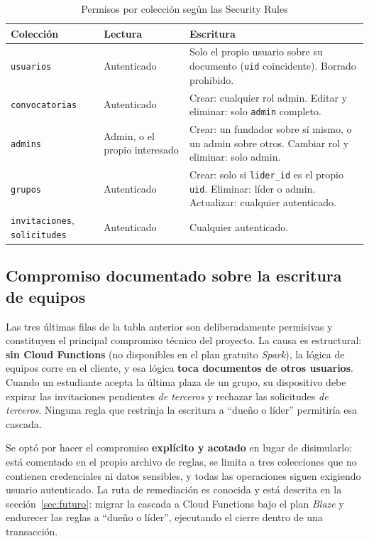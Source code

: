 \documentclass[12pt,a4paper]{article}
\begin{document}
\begin{table}[htbp]
\centering
\caption{Permisos por colección según las Security Rules}
\begin{tabular}{L{2.6cm}L{2.6cm}L{8.3cm}}
\toprule
\textbf{Colección} & \textbf{Lectura} & \textbf{Escritura} \\
\midrule
\texttt{usuarios} & Autenticado & Solo el propio usuario sobre su documento (\texttt{uid} coincidente). Borrado prohibido. \\
\texttt{convocatorias} & Autenticado & Crear: cualquier rol admin. Editar y eliminar: solo \texttt{admin} completo. \\
\texttt{admins} & Admin, o el propio interesado & Crear: un fundador sobre sí mismo, o un admin sobre otros. Cambiar rol y eliminar: solo admin. \\
\texttt{grupos} & Autenticado & Crear: solo si \texttt{lider\_id} es el propio \texttt{uid}. Eliminar: líder o admin. Actualizar: cualquier autenticado. \\
\texttt{invitaciones}, \texttt{solicitudes} & Autenticado & Cualquier autenticado. \\
\bottomrule
\end{tabular}
\end{table}

\subsection{Compromiso documentado sobre la escritura de equipos}
\label{sec:tradeoff}
Las tres últimas filas de la tabla anterior son deliberadamente permisivas y constituyen el principal compromiso técnico del proyecto. La causa es estructural: \textbf{sin Cloud Functions} (no disponibles en el plan gratuito \emph{Spark}), la lógica de equipos corre en el cliente, y esa lógica \textbf{toca documentos de otros usuarios}. Cuando un estudiante acepta la última plaza de un grupo, su dispositivo debe expirar las invitaciones pendientes \emph{de terceros} y rechazar las solicitudes \emph{de terceros}. Ninguna regla que restrinja la escritura a ``dueño o líder'' permitiría esa cascada.

Se optó por hacer el compromiso \textbf{explícito y acotado} en lugar de disimularlo: está comentado en el propio archivo de reglas, se limita a tres colecciones que no contienen credenciales ni datos sensibles, y todas las operaciones siguen exigiendo usuario autenticado. La ruta de remediación es conocida y está descrita en la sección~\ref{sec:futuro}: migrar la cascada a Cloud Functions bajo el plan \emph{Blaze} y endurecer las reglas a ``dueño o líder'', ejecutando el cierre dentro de una transacción.
\end{document}
